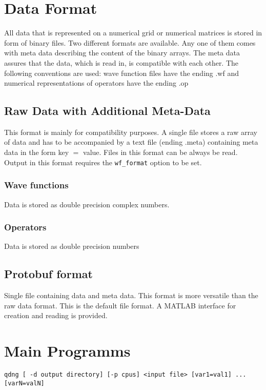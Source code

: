 \documentclass[a4paper,12pt]{scrbook}
\begin{document}
\chapter{Data Format}
All data that is represented on a numerical grid
or numerical matrices is stored in form of binary files.
Two different formats are available. Any one of them
comes with meta data describing the content of the
binary arrays. The meta data assures that the data,
which is read in, is compatible with each other.
The following conventions are used: wave function
files have the ending .wf and numerical
representations of operators have the ending .op 

\section{Raw Data with Additional Meta-Data}
This format is mainly for compatibility purposes.
A single file stores a raw array of data
and has to be accompanied by a text file (ending .meta)
containing meta data in the form key $=$ value.
Files in this format can be always be read. Output
in this format requires the \texttt{wf\_format}
option to be set.

\subsection{Wave functions}
Data is stored as double precision complex numbers.

\subsection{Operators}
Data is stored as double precision numbers

\section{Protobuf format}
Single file containing data and meta data.
This format is more versatile than the raw data format. This is the default file format.
A MATLAB interface for creation and reading is provided.


\chapter{Main Programms}

\begin{verbatim}
qdng [ -d output directory] [-p cpus] <input file> [var1=val1] ... [varN=valN] 
\end{verbatim}
\end{document}
